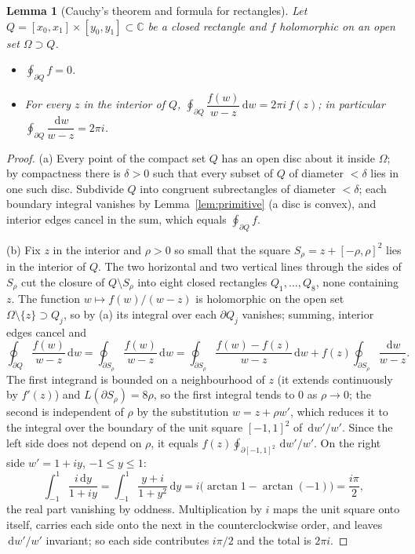 \documentclass[11pt]{article}
\newtheorem{lemma}[theorem]{Lemma}
\theoremstyle{definition}
\newcommand{\C}{\mathbb{C}}
\newcommand{\dd}{\,\mathrm{d}}
\begin{document}
\begin{lemma}[Cauchy's theorem and formula for rectangles]\label{lem:rect}
Let $Q=[x_0,x_1]\times[y_0,y_1]\subset\C$ be a closed rectangle and $f$ holomorphic on an open set $\Omega\supset Q$.
\begin{itemize}
\item[(a)] $\oint_{\partial Q}f=0$.
\item[(b)] For every $z$ in the interior of $Q$, $\oint_{\partial Q}\dfrac{f(w)}{w-z}\dd w=2\pi i\,f(z)$; in particular $\oint_{\partial Q}\dfrac{\dd w}{w-z}=2\pi i$.
\end{itemize}
\end{lemma}
\begin{proof}
(a) Every point of the compact set $Q$ has an open disc about it inside $\Omega$; by compactness there is $\delta>0$ such that every subset of $Q$ of diameter $<\delta$ lies in one such disc. Subdivide $Q$ into congruent subrectangles of diameter $<\delta$; each boundary integral vanishes by Lemma~\ref{lem:primitive} (a disc is convex), and interior edges cancel in the sum, which equals $\oint_{\partial Q}f$.

(b) Fix $z$ in the interior and $\rho>0$ so small that the square $S_\rho=z+[-\rho,\rho]^{2}$ lies in the interior of $Q$.
The two horizontal and two vertical lines through the sides of $S_\rho$ cut the closure of $Q\setminus S_\rho$ into eight closed rectangles $Q_1,\dots,Q_8$, none containing $z$. The function $w\mapsto f(w)/(w-z)$ is holomorphic on the open set $\Omega\setminus\{z\}\supset Q_j$, so by (a) its integral over each $\partial Q_j$ vanishes; summing, interior edges cancel and
\[
\oint_{\partial Q}\frac{f(w)}{w-z}\dd w=\oint_{\partial S_\rho}\frac{f(w)}{w-z}\dd w
=\oint_{\partial S_\rho}\frac{f(w)-f(z)}{w-z}\dd w+f(z)\oint_{\partial S_\rho}\frac{\dd w}{w-z}.
\]
The first integrand is bounded on a neighbourhood of $z$ (it extends continuously by $f'(z)$) and $L(\partial S_\rho)=8\rho$, so the first integral tends to $0$ as $\rho\to0$; the second is independent of $\rho$ by the substitution $w=z+\rho w'$, which reduces it to the integral over the boundary of the unit square $[-1,1]^{2}$ of $\dd w'/w'$.
Since the left side does not depend on $\rho$, it equals $f(z)\oint_{\partial[-1,1]^{2}}\dd w'/w'$.
On the right side $w'=1+iy$, $-1\le y\le1$:
\[
\int_{-1}^{1}\frac{i\dd y}{1+iy}=\int_{-1}^{1}\frac{y+i}{1+y^{2}}\dd y=i\bigl(\arctan1-\arctan(-1)\bigr)=\frac{i\pi}{2},
\]
the real part vanishing by oddness. Multiplication by $i$ maps the unit square onto itself, carries each side onto the next in the counterclockwise order, and leaves $\dd w'/w'$ invariant; so each side contributes $i\pi/2$ and the total is $2\pi i$.
\end{proof}
\end{document}
